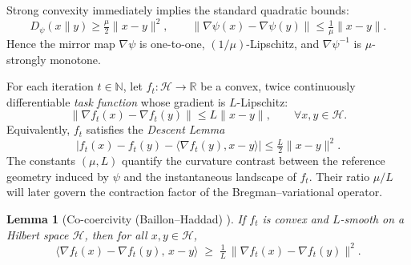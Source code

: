\documentclass[11pt]{article}
\newcommand{\inner}[2]{\langle #1 , #2 \rangle}
\theoremstyle{plain}
\newtheorem{lemma}[theorem]{Lemma}
\theoremstyle{definition}
\theoremstyle{remark}
\begin{document}
Strong convexity immediately implies the standard quadratic bounds:
\begin{equation}
D_\psi(x\|y)\ge\tfrac{\mu}{2}\|x-y\|^2,
\qquad
\|\nabla\psi(x)-\nabla\psi(y)\|\le\tfrac{1}{\mu}\|x-y\|.
\label{eq:bregman-bound}
\end{equation}
Hence the mirror map $\nabla\psi$ is one-to-one, $(1/\mu)$-Lipschitz, 
and $\nabla\psi^{-1}$ is $\mu$-strongly monotone.


For each iteration $t\in\mathbb N$, 
let $f_t:\mathcal H\to\mathbb R$ be a convex, twice continuously differentiable 
\emph{task function} whose gradient is $L$-Lipschitz:
\begin{equation}
\|\nabla f_t(x)-\nabla f_t(y)\|\le L\|x-y\|,
\qquad \forall x,y\in\mathcal H.
\label{eq:l-smooth}
\end{equation}
Equivalently, $f_t$ satisfies the \emph{Descent Lemma}
\begin{equation}
|f_t(x)-f_t(y)-\inner{\nabla f_t(y)}{x-y}|
\le\tfrac{L}{2}\|x-y\|^2.
\label{eq:descent-lemma}
\end{equation}
The constants $(\mu,L)$ quantify the curvature contrast between 
the reference geometry induced by $\psi$ and 
the instantaneous landscape of $f_t$.  
Their ratio $\mu/L$ will later govern the contraction factor 
of the Bregman–variational operator.




\begin{lemma}[Co-coercivity (Baillon--Haddad) \cite{Baillon1977,Bauschke2011}]
\label{lem:cocoercivity}
If $f_t$ is convex and $L$-smooth on a Hilbert space $\mathcal H$, then for all $x,y\in\mathcal H$,
\begin{equation}
\langle\nabla f_t(x)-\nabla f_t(y),\,x-y\rangle
\;\ge\;\tfrac{1}{L}\,\|\nabla f_t(x)-\nabla f_t(y)\|^2 .
\label{eq:cocoercivity}
\end{equation}
\end{lemma}
\end{document}
